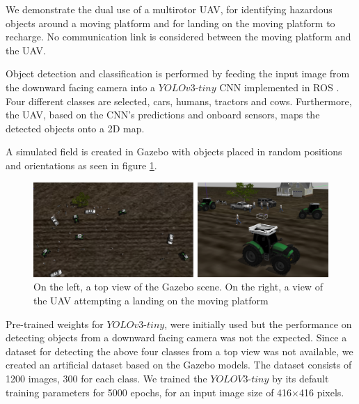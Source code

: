 \documentclass[conference]{IEEEtran}
\begin{document}
We demonstrate the dual use of a multirotor UAV, for identifying
hazardous objects around a moving platform and for landing on the
moving platform to recharge.
%
%
No communication link is considered between the moving platform and the UAV.


Object detection and classification is performed by feeding the input
image from the downward facing camera into a $YOLOv3$-$tiny$ CNN
\cite{yolov3} implemented in ROS \cite{bjelonicYolo2018}. Four
different classes are selected, cars, humans, tractors and
cows. Furthermore, the UAV, based on the CNN's predictions and onboard
sensors, maps the detected objects onto a 2D map.
 

A simulated field is created in Gazebo with objects placed in random
positions and orientations as seen in figure \ref{fig:Gazebo}.

\begin{figure}[h]
\centering
\includegraphics[scale=0.2]{gazebo_scalled.png}
\caption{On the left, a top view of the Gazebo scene. On the right, a view of the UAV attempting a landing on the moving platform }
\label{fig:Gazebo}
\end{figure}

Pre-trained weights for $YOLOv3$-$tiny$, were initially used but the
performance on detecting objects from a downward facing camera was
not the expected. Since a dataset for detecting the above four classes
from a top view was not available, we created an artificial dataset
based on the Gazebo models. The dataset consists of 1200 images, 300
for each class. We trained the $YOLOV3$-$tiny$ by its default training
parameters for 5000 epochs, for an input image size of 416$\times$416
pixels.

\end{document}
